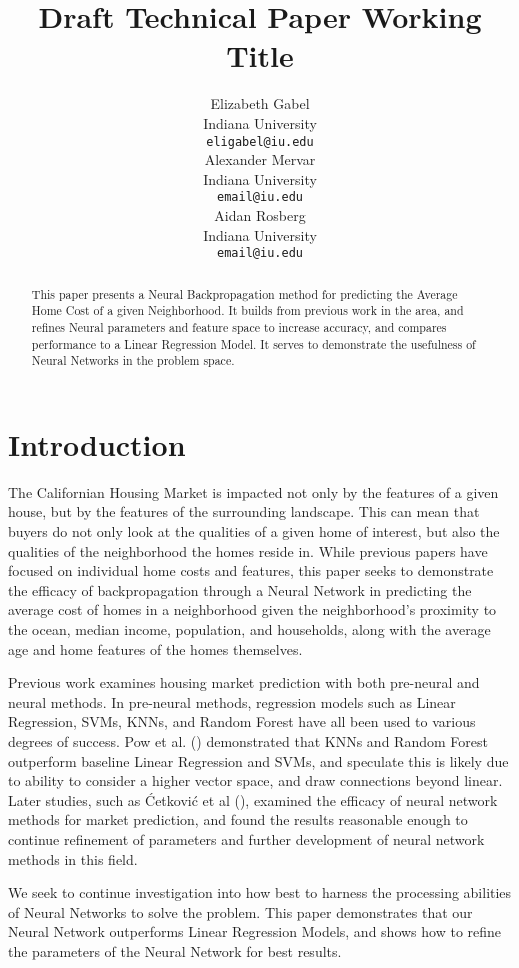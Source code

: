 \documentclass[11pt]{article}
\title{Draft Technical Paper Working Title}
\author{Elizabeth Gabel \\
  Indiana University \\
  \texttt{eligabel@iu.edu} \\\And
  Alexander Mervar \\
  Indiana University \\
  \texttt{email@iu.edu} \\\And
  Aidan Rosberg \\
  Indiana University \\
  \texttt{email@iu.edu}\\}
\begin{document}
\maketitle
\begin{abstract}
This paper presents a Neural Backpropagation method for predicting the Average Home Cost of a given Neighborhood.  It builds from previous work in the area, and refines Neural parameters and feature space to increase accuracy, and compares performance to a Linear Regression Model.  It serves to demonstrate the usefulness of Neural Networks in the problem space.
\end{abstract}

\section{Introduction}

The Californian Housing Market is impacted not only by the features of a given house, but by the features of the surrounding landscape.  This can mean that buyers do not only look at the qualities of a given home of interest, but also the qualities of  the neighborhood the homes reside in.  While previous papers have focused on individual home costs and features, this paper seeks to demonstrate the efficacy of backpropagation through a Neural Network in predicting the average cost of homes in a neighborhood given the neighborhood’s proximity to the ocean, median income, population, and households, along with the average age and home features of the homes themselves.

Previous work examines housing market prediction with both pre-neural and neural methods.  In pre-neural methods, regression models such as Linear Regression, SVMs, KNNs, and Random Forest have all been used to various degrees of success.  Pow et al. (\citeyear{Pow2014}) demonstrated that KNNs and Random Forest outperform baseline Linear Regression and SVMs, and speculate this is likely due to ability to consider a higher vector space, and draw connections beyond linear.  Later studies, such as Ćetković et al (\citeyear{Cetkovic2018}), examined the efficacy of neural network methods for market prediction, and found the results reasonable enough to continue refinement of parameters and further development of neural network methods in this field.

We seek to continue investigation into how best to harness the processing abilities of Neural Networks to solve the problem.  This paper demonstrates that our Neural Network outperforms Linear Regression Models, and shows how to refine the parameters of the Neural Network for best results.
\end{document}
